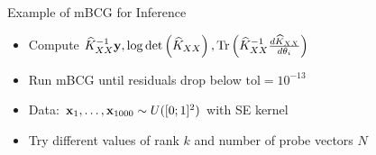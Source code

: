 \documentclass{beamer}
\begin{document}

\begin{frame}{Example of mBCG for Inference}
\begin{itemize}[<+->]
    \item Compute $\widehat K_{XX}^{-1} \boldsymbol{\mathbf{y}}, \log \det \left( \widehat K_{XX} \right), \operatorname{Tr} \left( \widehat K_{XX}^{-1} \frac{d \widehat K_{XX}}{d\theta_i} \right)$
    \item Run mBCG until residuals drop below $\text{tol}=10^{-13}$
    \item Data: $\boldsymbol{\mathbf{x}}_1, \ldots, \boldsymbol{\mathbf{x}}_{1000} \sim \mathcal \mathcal U([0;1]^2)$ with SE kernel
    \item Try different values of rank $k$ and number of probe vectors $N$
\end{itemize}
\end{frame}
\end{document}
